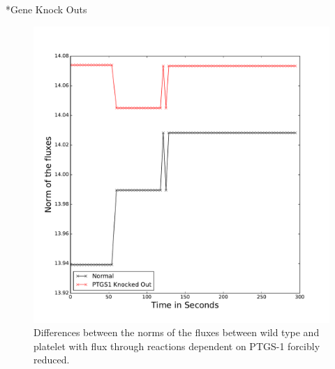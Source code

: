 \documentclass[11pt]{article}
\makeatletter
\renewcommand\subsection{\@startsection
	{subsection}{2}{0mm}
	{-0.05in}
	{-0.5\baselineskip}
	{\normalfont\normalsize\bfseries}}
\makeatother
\begin{document}
\subsection*{Gene Knock Outs}
\begin{figure}
\centering
\includegraphics[scale=.35]{../figures/NormOfFluxesNormalAndKnockedCaSpike}
\caption{Differences between the norms of the fluxes between wild type and platelet with flux through reactions dependent on PTGS-1 forcibly reduced.}
\label{fig:normfluxes}
\end{figure}
\end{document}
